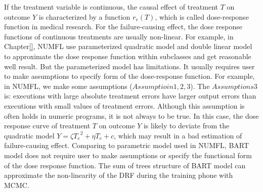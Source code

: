 If the treatment variable is continuous, the causal effect of treatment $T$ on outcome $Y$ is characterized by a function $r_e (T)$, which is called dose-response function in medical research. For the failure-causing effect, the dose response functions of continuous treatments are usually non-linear. For example, in Chapter\ref{}, NUMFL use parameterized quadratic model and double linear model to approximate the dose response function within subclasses and get reasonable well result. But the parameterized model has limitations. It usually requires user to make assumptions to specify form of the dose-response function.  For example, in NUMFL, we make some assumptions ($Assumptioin 1, 2, 3$).  The  $Assumptions3$ is: executions with large absolute treatment errors have larger output errors than executions with small values of treatment errors.  Although this assumption is often holds in numeric programs, it is not always to be true. In this case,  the dose response curve of treatment $T$ on outcome $Y$ is likely to deviate from the quadratic model $Y = \zeta {T_e}^2 + \eta {T_e} + c$, which may result in a bad estimation of failure-causing effect. Comparing to parametric model used in NUMFL, BART model does not require user to make assumptions or specify the functional form of the dose response function. The sum of trees structure of BART model can approximate the non-linearity of the DRF during the training phone with MCMC.

